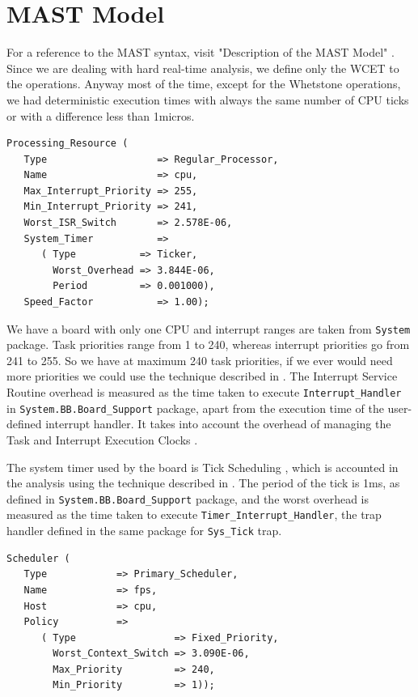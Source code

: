 \documentclass{article}
\begin{document}
\section{MAST Model}

For a reference to the MAST syntax, visit "Description of the MAST Model" \cite{mast-description}. Since we are dealing with hard real-time analysis, we define only the WCET to the operations. Anyway most of the time, except for the Whetstone operations, we had deterministic execution times with always the same number of CPU ticks or with a difference less than 1micros.

\begin{lstlisting}
Processing_Resource (
   Type                   => Regular_Processor,
   Name                   => cpu,
   Max_Interrupt_Priority => 255,
   Min_Interrupt_Priority => 241,
   Worst_ISR_Switch       => 2.578E-06,
   System_Timer           =>
      ( Type           => Ticker,
        Worst_Overhead => 3.844E-06,
        Period         => 0.001000),
   Speed_Factor           => 1.00);
\end{lstlisting}

We have a board with only one CPU and interrupt ranges are taken from \texttt{System} package. Task priorities range from 1 to 240, whereas interrupt priorities go from 241 to 255. So we have at maximum 240 task priorities, if we ever would need more priorities we could use the technique described in \cite{limited-priorities}. The Interrupt Service Routine overhead is measured as the time taken to execute \texttt{Interrupt\_Handler} in \texttt{System.BB.Board\_Support} package, apart from the execution time of the user-defined interrupt handler. It takes into account the overhead of managing the Task and Interrupt Execution Clocks \cite{etc}.

The system timer used by the board is Tick Scheduling \cite{tick-scheduling}, which is accounted in the analysis using the technique described in \cite{effects-runtime}. The period of the tick is 1ms, as defined in \texttt{System.BB.Board\_Support} package, and the worst overhead is measured as the time taken to execute \texttt{Timer\_Interrupt\_Handler}, the trap handler defined in the same package for \texttt{Sys\_Tick} trap.

\begin{lstlisting}
Scheduler (
   Type            => Primary_Scheduler,
   Name            => fps,
   Host            => cpu,
   Policy          =>
      ( Type                 => Fixed_Priority,
        Worst_Context_Switch => 3.090E-06,
        Max_Priority         => 240,
        Min_Priority         => 1));
\end{lstlisting}
\end{document}
